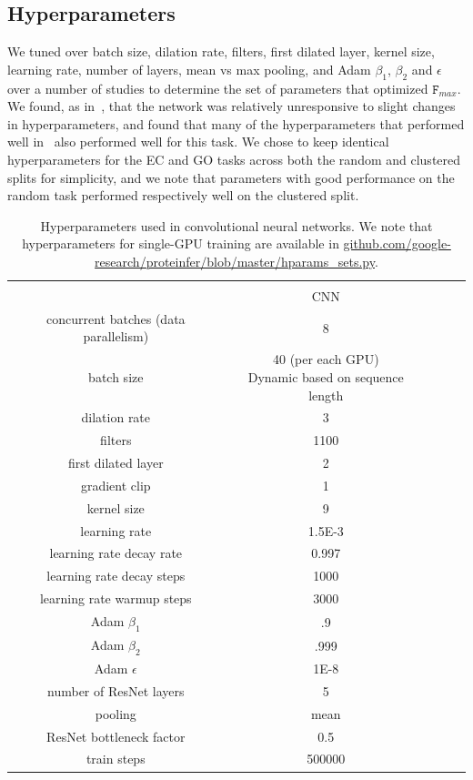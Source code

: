 \subsection{Hyperparameters}
We tuned over batch size, dilation rate, filters, first dilated layer, kernel size, learning rate, number of layers, mean vs max pooling, and Adam $\beta_1$, $\beta_2$ and $\epsilon$~\citep{kingma2014adam} over a number of studies to determine the set of parameters that optimized $\texttt{F}_{max}$. We found, as in~\cite{bileschi}, that the network was relatively unresponsive to slight changes in hyperparameters, and found that many of the hyperparameters that performed well in~\cite{bileschi} also performed well for this task. We chose to keep identical hyperparameters for the EC and GO tasks across both the random and clustered splits for simplicity, and we note that parameters with good performance on the random task performed respectively well on the clustered split. 
\begin{table}[htbp]
\centering
\def\arraystretch{1.1}
\begin{tabular}{|c|c|c|c|c|}
\hline
                           & \\
                           & CNN \\
\Xhline{1pt}
concurrent batches (data parallelism) & 8 \\
\hline
batch size                 & \shortstack{40 (per each GPU) \\ Dynamic based on sequence length} \\
\hline
dilation rate              & 3 \\
\hline
filters                    & 1100  \\
\hline
first dilated layer        & 2 \\
\hline
gradient clip              & 1 \\
\hline
kernel size                & 9 \\
\hline
learning rate              & 1.5E-3 \\
\hline
learning rate decay rate   & 0.997 \\
\hline
learning rate decay steps  & 1000 \\
\hline
learning rate warmup steps & 3000 \\
\hline
Adam $\beta_1$              & .9 \\
\hline
Adam $\beta_2$              & .999 \\
\hline
Adam $\epsilon$             & 1E-8 \\
\hline
number of ResNet layers     & 5 \\
\hline
pooling                     & mean \\
\hline
ResNet bottleneck factor    & 0.5 \\
\hline
train steps                 & 500000 \\
\hline
\end{tabular}
\caption{Hyperparameters used in convolutional neural networks. We note that hyperparameters for single-GPU training are available in \url{github.com/google-research/proteinfer/blob/master/hparams_sets.py}.}
\label{tab:nn_hparams}
\end{table} 
\pagebreak
